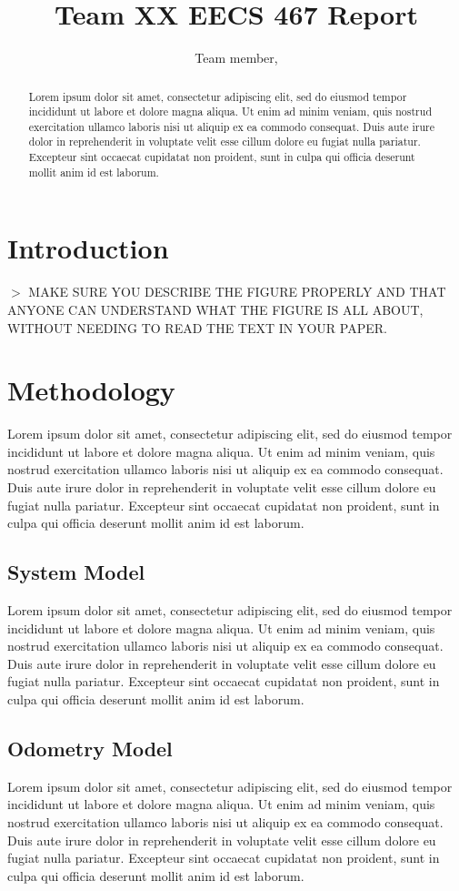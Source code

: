 \documentclass[conference]{IEEEtran}
\title{Team XX EECS 467 Report}
\author{Team member,  }
\begin{document}
\maketitle
\begin{abstract}
Lorem ipsum dolor sit amet, consectetur adipiscing elit, sed do eiusmod tempor incididunt ut labore et dolore magna aliqua. Ut enim ad minim veniam, quis nostrud exercitation ullamco laboris nisi ut aliquip ex ea commodo consequat. Duis aute irure dolor in reprehenderit in voluptate velit esse cillum dolore eu fugiat nulla pariatur. Excepteur sint occaecat cupidatat non proident, sunt in culpa qui officia deserunt mollit anim id est laborum.
\end{abstract}
\section{Introduction}

$>$ MAKE SURE YOU DESCRIBE THE FIGURE PROPERLY AND THAT ANYONE CAN UNDERSTAND WHAT THE FIGURE IS ALL ABOUT, WITHOUT NEEDING TO READ THE TEXT IN YOUR PAPER.

\section{Methodology}
Lorem ipsum dolor sit amet, consectetur adipiscing elit, sed do eiusmod tempor incididunt ut labore et dolore magna aliqua. Ut enim ad minim veniam, quis nostrud exercitation ullamco laboris nisi ut aliquip ex ea commodo consequat. Duis aute irure dolor in reprehenderit in voluptate velit esse cillum dolore eu fugiat nulla pariatur. Excepteur sint occaecat cupidatat non proident, sunt in culpa qui officia deserunt mollit anim id est laborum.

\subsection{System Model}
Lorem ipsum dolor sit amet, consectetur adipiscing elit, sed do eiusmod tempor incididunt ut labore et dolore magna aliqua. Ut enim ad minim veniam, quis nostrud exercitation ullamco laboris nisi ut aliquip ex ea commodo consequat. Duis aute irure dolor in reprehenderit in voluptate velit esse cillum dolore eu fugiat nulla pariatur. Excepteur sint occaecat cupidatat non proident, sunt in culpa qui officia deserunt mollit anim id est laborum.

\subsection{Odometry Model}
Lorem ipsum dolor sit amet, consectetur adipiscing elit, sed do eiusmod tempor incididunt ut labore et dolore magna aliqua. Ut enim ad minim veniam, quis nostrud exercitation ullamco laboris nisi ut aliquip ex ea commodo consequat. Duis aute irure dolor in reprehenderit in voluptate velit esse cillum dolore eu fugiat nulla pariatur. Excepteur sint occaecat cupidatat non proident, sunt in culpa qui officia deserunt mollit anim id est laborum.
\end{document}
